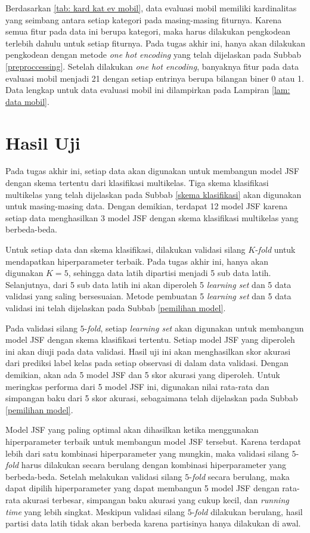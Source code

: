 \noindent Berdasarkan \ref{tab: kard kat ev mobil}, data evaluasi mobil memiliki kardinalitas yang seimbang antara setiap kategori pada masing-masing fiturnya. Karena semua fitur pada data ini berupa kategori, maka harus dilakukan pengkodean terlebih dahulu untuk setiap fiturnya. Pada tugas akhir ini, hanya akan dilakukan pengkodean dengan metode \emph{one hot encoding} yang telah dijelaskan pada Subbab \ref{preproccessing}. Setelah dilakukan \emph{one hot encoding}, banyaknya fitur pada data evaluasi mobil menjadi 21 dengan setiap entrinya berupa bilangan biner 0 atau 1. Data lengkap untuk data evaluasi mobil ini dilampirkan pada Lampiran \ref{lam: data mobil}.

\section{Hasil Uji} \label{hasil uji}
\noindent Pada tugas akhir ini, setiap data akan digunakan untuk membangun model JSF dengan skema tertentu dari klasifikasi multikelas. Tiga skema klasifikasi multikelas yang telah dijelaskan pada Subbab \ref{skema klasifikasi} akan digunakan untuk masing-masing data. Dengan demikian, terdapat 12 model JSF karena setiap data menghasilkan 3 model JSF dengan skema klasifikasi multikelas yang berbeda-beda.

\noindent Untuk setiap data dan skema klasifikasi, dilakukan validasi silang $K$-\emph{fold} untuk mendapatkan hiperparameter terbaik. Pada tugas akhir ini, hanya akan digunakan $K=5$, sehingga data latih dipartisi menjadi 5 sub data latih. Selanjutnya, dari 5 sub data latih ini akan diperoleh 5 \emph{learning set} dan 5 data validasi yang saling bersesuaian. Metode pembuatan 5 \emph{learning set} dan 5 data validasi ini telah dijelaskan pada Subbab \ref{pemilihan model}.

\noindent Pada validasi silang $5$-\emph{fold}, setiap \emph{learning set} akan digunakan untuk membangun model JSF dengan skema klasifikasi tertentu. Setiap model JSF yang diperoleh ini akan diuji pada data validasi. Hasil uji ini akan menghasilkan skor akurasi dari prediksi label kelas pada setiap observasi di dalam data validasi.  Dengan demikian, akan ada 5 model JSF dan 5 skor akurasi yang diperoleh. Untuk meringkas performa dari 5 model JSF ini, digunakan nilai rata-rata dan simpangan baku dari 5 skor akurasi, sebagaimana telah dijelaskan pada Subbab \ref{pemilihan model}.

\noindent Model JSF yang paling optimal akan dihasilkan ketika menggunakan hiperparameter terbaik untuk membangun model JSF tersebut. Karena terdapat lebih dari satu kombinasi hiperparameter yang mungkin, maka validasi silang $5$-\emph{fold} harus dilakukan secara berulang dengan kombinasi hiperparameter yang berbeda-beda. Setelah melakukan validasi silang $5$-\emph{fold} secara berulang, maka dapat dipilih hiperparameter yang dapat membangun 5 model JSF dengan rata-rata akurasi terbesar, simpangan baku akurasi yang cukup kecil, dan \emph{running time} yang lebih singkat. Meskipun validasi silang $5$-\emph{fold} dilakukan berulang, hasil partisi data latih tidak akan berbeda karena partisinya hanya dilakukan di awal.

